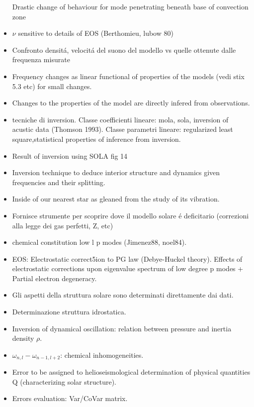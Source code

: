\documentclass[oneside,12pt,fleqn]{memoir}
\begin{document}
\begin{itemize}
    \clearpage
    
    Drastic change of behaviour for mode penetrating beneath base of convection zone
    
    \item $\nu$ sensitive to details of EOS (Berthomieu, lubow 80)
    \item Confronto densit\'a, velocit\'a del suono del modello vs quelle ottenute dalle frequenza misurate
    \item Frequency changes as linear functional of properties of the models (vedi stix 5.3 etc) for small changes.
    \item Changes to the properties of the model are directly infered from observations.
    \item tecniche di inversion. Classe coefficienti lineare: mola, sola, inversion of acustic data (Thomson 1993). Classe parametri lineare: regularized least square,statistical properties of inference from inversion.
    \item Result of inversion using SOLA fig 14
    \item Inversion technique to deduce interior structure and dynamics given frequencies and their splitting.
    \item Inside of our nearest star as gleaned from the study of its vibration.
    \item Fornisce strumente per scoprire dove il modello solare \'e deficitario (correzioni alla legge dei gas perfetti, Z, etc)
    \item chemical constitution low l p modes (Jimenez88, noel84).
    \item EOS: Electrostatic correct5ion to PG law (Debye-Huckel theory). Effects of electrostatic corrections upon eigenvalue spectrum of low degree p modes + Partial electron degeneracy.
    \item Gli aspetti della struttura solare sono determinati direttamente dai dati.
    \item Determinazione struttura idrostatica.
    \item Inversion of dynamical oscillation: relation between pressure and inertia density $\rho$.
    \item $\omega_{n,l}-\omega_{n-1,l+2}$: chemical inhomogeneities.
    \item Error to be assigned to helioseismological determination of physical quantities Q (characterizing solar structure).
    \item Errors evaluation: Var/CoVar matrix.
\end{itemize}
\end{document}
